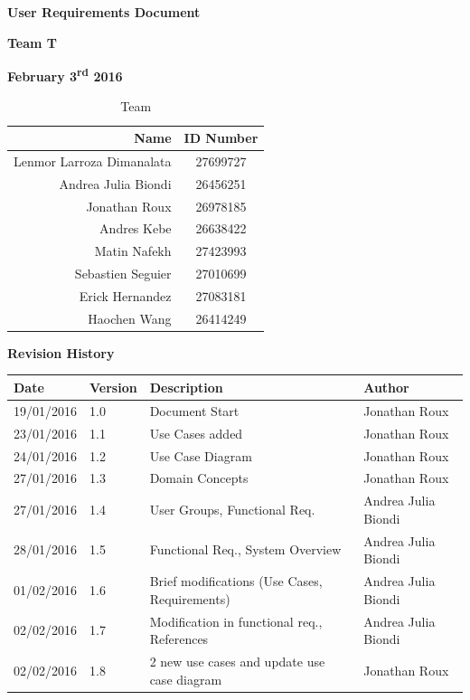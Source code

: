 \documentclass[12pt]{article}
\begin{document}
\vspace*{0.5in}
\centerline{\bf\Large User Requirements Document}

\vspace*{0.5in}
\centerline{\bf\Large Team T}

\vspace*{0.5in}
\centerline{\bf\Large February 3\textsuperscript{rd} 2016}

\vspace*{1.5in}
\begin{table}[htbp]
\caption{Team}
\begin{center}
\begin{tabular}{|r | c|}
\hline
Name & ID Number \\
\hline\hline
Lenmor Larroza Dimanalata & 27699727 \\
\hline
Andrea Julia Biondi & 26456251 \\
\hline
Jonathan Roux & 26978185 \\
\hline
Andres Kebe & 26638422 \\
\hline
Matin Nafekh & 27423993 \\
\hline
Sebastien Seguier & 27010699 \\
\hline
Erick Hernandez & 27083181 \\
\hline
Haochen Wang & 26414249 \\
\hline

\end{tabular}
\end{center}
\end{table}

\clearpage
\begin{table}
\centerline{\bf\Large Revision History}
\begin{center}
\begin{tabular}{|l | l| l|l|}
\hline
\bf Date & \bf Version & \bf Description & \bf Author \\
\hline
19/01/2016 & 1.0 & Document Start & Jonathan Roux \\
\hline
23/01/2016 & 1.1 & Use Cases added & Jonathan Roux \\
\hline
24/01/2016 & 1.2 & Use Case Diagram & Jonathan Roux \\
\hline
27/01/2016 & 1.3 & Domain Concepts & Jonathan Roux \\
\hline
27/01/2016 & 1.4 & User Groups, Functional Req. & Andrea Julia Biondi \\
\hline
28/01/2016 & 1.5 & Functional Req., System Overview & Andrea Julia Biondi \\
\hline
01/02/2016 & 1.6 & Brief modifications (Use Cases, Requirements) & Andrea Julia Biondi \\
\hline
02/02/2016 & 1.7 & Modification in functional req., References & Andrea Julia Biondi \\
\hline
02/02/2016 & 1.8 & 2 new use cases and update use case diagram & Jonathan Roux \\
\hline

\end{tabular}
\end{center}
\end{table}
\end{document}
